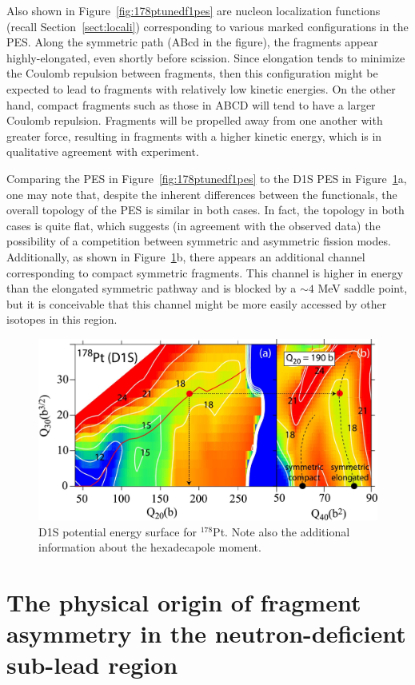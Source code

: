 Also shown in Figure~\ref{fig:178ptunedf1pes} are nucleon localization functions (recall Section~\ref{sect:locali}) corresponding to various marked configurations in the PES. Along the symmetric path (ABcd in the figure), the fragments appear highly-elongated, even shortly before scission. Since elongation tends to minimize the Coulomb repulsion between fragments, then this configuration might be expected to lead to fragments with relatively low kinetic energies. On the other hand, compact fragments such as those in ABCD will tend to have a larger Coulomb repulsion. Fragments will be propelled away from one another with greater force, resulting in fragments with a higher kinetic energy, which is in qualitative agreement with experiment.

Comparing the {\hfb} PES in Figure~\ref{fig:178ptunedf1pes} to the D1S PES in Figure~\ref{fig:178ptd1spes}a, one may note that, despite the inherent differences between the functionals, the overall topology of the PES is similar in both cases. In fact, the topology in both cases is quite flat, which suggests (in agreement with the observed data) the possibility of a competition between symmetric and asymmetric fission modes. Additionally, as shown in Figure~\ref{fig:178ptd1spes}b, there appears an additional channel corresponding to compact symmetric fragments. This channel is higher in energy than the elongated symmetric pathway and is blocked by a ${\sim}4$ MeV saddle point, but it is conceivable that this channel might be more easily accessed by other isotopes in this region.

\begin{figure}
	\centering
	\includegraphics[width=0.7\linewidth]{TeX_files/178Pt_D1S_pes.jpg}
	\caption[D1S potential energy surface for $^{178}$Pt]{D1S potential energy surface for $^{178}$Pt. Note also the additional information about the hexadecapole moment.}
	\label{fig:178ptd1spes}
\end{figure}



\section{The physical origin of fragment asymmetry in the neutron-deficient sub-lead region}

